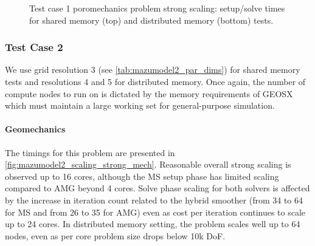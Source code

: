 \begin{figure} [htbp]
  \begin{subfigure}[t]{0.48\textwidth}
    \centering
    
  \end{subfigure}
  \hfill
  \begin{subfigure}[t]{0.48\textwidth}
    \centering
    
  \end{subfigure}
  \begin{subfigure}[t]{0.48\textwidth}
    \centering
    
  \end{subfigure}
  \hfill
  \begin{subfigure}[t]{0.48\textwidth}
    \centering
    
  \end{subfigure}
  \caption[Test case 1 poromechanics problem strong scaling]{Test case 1 poromechanics problem strong scaling: setup/solve times for shared memory (top) and distributed memory (bottom) tests.}
  \label{fig:cart_scaling_strong_poro}
\end{figure}

\subsubsection{Test Case 2}

We use grid resolution 3 (see \cref{tab:mazumodel2_par_dims}) for shared memory tests and resolutions 4 and 5 for distributed memory.   Once again, the number of compute nodes to run on is dictated by the memory requirements of GEOSX which must maintain a large working set for general-purpose simulation.

\paragraph{Geomechanics}
The timings for this problem are presented in \cref{fig:mazumodel2_scaling_strong_mech}. Reasonable overall strong scaling is observed up to 16 cores, although the MS setup phase has limited scaling compared to AMG beyond 4 cores.   Solve phase scaling for both solvers is affected by the increase in iteration count related to the hybrid smoother (from 34 to 64 for MS and from 26 to 35 for AMG) even as cost per iteration continues to scale up to 24 cores.   In distributed memory setting, the problem scales well up to 64 nodes, even as per core problem size drops below 10k DoF.

